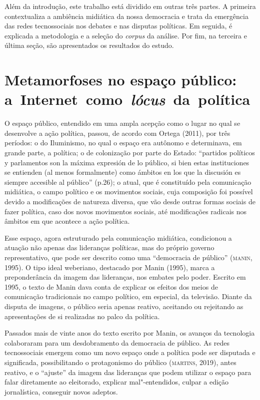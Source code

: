 Além da introdução, este trabalho está dividido em outras três partes. A
primeira contextualiza a ambiência midiática da nossa democracia e trata
da emergência das redes tecnossociais nos debates e nas disputas
políticas. Em seguida, é explicada a metodologia e a seleção do
\emph{corpus} da análise. Por fim, na terceira e última seção, são
apresentados os resultados do estudo.

\section{Metamorfoses no espaço público: a~Internet~como~\emph{lócus}~da~política}

\noindent{}O espaço público, entendido em uma ampla acepção como o lugar no qual se
desenvolve a ação política, passou, de acordo com Ortega (2011), por
três períodos: o do Iluminismo, no qual o espaço era autônomo e
determinava, em grande parte, a política; o de colonização por parte do
Estado: ``partidos políticos y parlamentos son la máxima expresión de lo
público, si bien estas instituciones se entienden (al menos formalmente)
como ámbitos en los que la discusión es siempre accesible al público''
(p.26); o atual, que é constituído pela comunicação midiática, o campo
político e os movimentos sociais, cuja composição foi possível devido a
modificações de natureza diversa, que vão desde outras formas sociais de
fazer política, caso dos novos movimentos sociais, até modificações
radicais nos âmbitos em que acontece a ação política.

Esse espaço, agora estruturado pela comunicação midiática, condicionou a
atuação não apenas das lideranças políticas, mas do próprio governo
representativo, que pode ser descrito como uma ``democracia de público''
(\textsc{manin}, 1995). O tipo ideal weberiano, destacado por Manin (1995), marca
a preponderância da imagem das lideranças, nos embates pelo poder.
Escrito em 1995, o texto de Manin dava conta de explicar os efeitos dos
meios de comunicação tradicionais no campo político, em especial, da
televisão. Diante da disputa de imagens, o público seria apenas reativo,
aceitando ou rejeitando as apresentações de si realizadas no palco da
política.

Passados mais de vinte anos do texto escrito por Manin, os avanços da
tecnologia colaboraram para um desdobramento da democracia de público.
As redes tecnossociais emergem como um novo espaço onde a política pode
ser disputada e significada, possibilitando o protagonismo do público
(\textsc{martins}, 2019), antes reativo, e o ``ajuste'' da imagem das lideranças
que podem utilizar o espaço para falar diretamente ao eleitorado,
explicar mal"-entendidos, culpar a edição jornalística, conseguir novos
adeptos.

